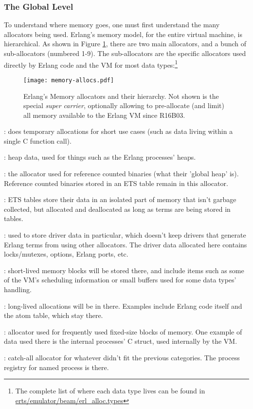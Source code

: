 \documentclass[11pt, oneside]{book}   	%
\begin{document}
\subsubsection{The Global Level}

To understand where memory goes, one must first understand the many allocators being used. Erlang's memory model, for the entire virtual machine, is hierarchical. As shown in Figure \ref{fig:allocators},  there are two main allocators, and a bunch of sub-allocators (numbered 1-9). The sub-allocators are the specific allocators used directly by Erlang code and the VM for most data types:\footnote{The complete list of where each data type lives can be found in \href{https://github.com/erlang/otp/blob/maint/erts/emulator/beam/erl\_alloc.types}{erts/emulator/beam/erl\_alloc.types}}


\begin{figure}
  \texttt{[image: memory-allocs.pdf]}%
  \caption{Erlang's Memory allocators and their hierarchy. Not shown is the special \emph{super carrier}, optionally allowing to pre-allocate (and limit) all memory available to the Erlang VM since R16B03.}%
   \label{fig:allocators}
\end{figure}

\begin{enumerate*}
    \item {}: does temporary allocations for short use cases (such as data living within a single C function call).
    \item {}: heap data, used for things such as the Erlang processes' heaps.
    \item {}: the allocator used for reference counted binaries (what their 'global heap' is). Reference counted binaries stored in an ETS table remain in this allocator.
    \item {}: ETS tables store their data in an isolated part of memory that isn't garbage collected, but allocated and deallocated as long as terms are being stored in tables.
    \item {}: used to store driver data in particular, which doesn't keep drivers that generate Erlang terms from using other allocators. The driver data allocated here contains locks/mutexes, options, Erlang ports, etc.
    \item {}: short-lived memory blocks will be stored there, and include items such as some of the VM's scheduling information or small buffers used for some data types' handling.
    \item {}: long-lived allocations will be in there. Examples include Erlang code itself and the atom table, which stay there.
    \item {}: allocator used for frequently used fixed-size blocks of memory. One example of data used there is the internal processes' C struct, used internally by the VM.
    \item {}: catch-all allocator for whatever didn't fit the previous categories. The process registry for named process is there.
\end{enumerate*}
\end{document}
